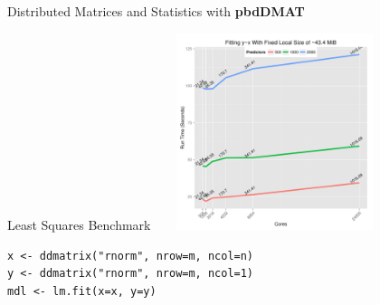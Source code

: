 \begin{frame}[fragile]
  \begin{block}{Distributed Matrices and Statistics with \textbf{pbdDMAT}}\pause
  \begin{center}
  \begin{minipage}{.9\textwidth}
  \centering\vspace{-.1cm}
	Least Squares Benchmark
		\includegraphics[width=7cm,height=5.75cm]{../common/pics/benchmarks/lmfit2}
  \end{minipage}
 \begin{minipage}{.9\textwidth}
 \vspace{-.36cm}
 \centering
\begin{lstlisting}[title=\ ,basicstyle=\scriptsize,numbers=none]
x <- ddmatrix("rnorm", nrow=m, ncol=n)
y <- ddmatrix("rnorm", nrow=m, ncol=1)
mdl <- lm.fit(x=x, y=y)
\end{lstlisting}
 \end{minipage}
 \end{center}
  \end{block}
\end{frame}


